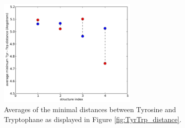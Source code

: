 \documentclass[english, a4paper, 12pt, titlepage, draft]{article}
\begin{document}
\begin{figure}
    \centering
    \includegraphics[width=0.6\textwidth]{figures/TyrTrp/average_mindist_TyrTrp.pdf}
    \caption{Averages of the minimal distances between Tyrosine and Tryptophane as displayed in Figure \ref{fig:TyrTrp_distance}.}
    \label{fig:TyrTrp_average}
\end{figure}         



          
 
\end{document}
